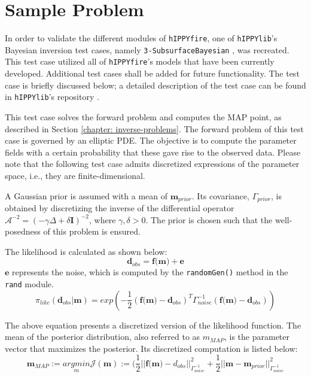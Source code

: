 \chapter{Sample Problem}
\label{chapter:sample-problem}

In order to validate the different modules of \texttt{hIPPYfire}, one of \texttt{hIPPYlib}'s Bayesian inversion test cases, namely \texttt{3-SubsurfaceBayesian} \cite{Villa_hIPPYlib_An_Extensible_2020}, was recreated. This test case utilized all of \texttt{hIPPYfire}'s models that have been currently developed. Additional test cases shall be added for future functionality. The test case is briefly discussed below; a detailed description of the test case can be found in \texttt{hIPPYlib}'s repository \cite{Villa_hIPPYlib_An_Extensible_2020}.

This test case solves the forward problem and computes the MAP point, as described in Section \ref{chapter: inverse-problems}. The forward problem of this test case is governed by an elliptic PDE. The objective is to compute the parameter fields with a certain probability that these gave rise to the observed data. Please note that the following test case admits discretized expressions of the parameter space, i.e., they are finite-dimensional.

A Gaussian prior is assumed with a mean of $\textbf{m}_{prior}$. Its covariance, \textbf{$\Gamma_{prior}$}, is obtained by discretizing the inverse of the differential operator $\mathcal{A}^{-2} = (-\gamma\Delta + \delta\textbf{I})^{-2}$, where $\gamma, \delta > 0 $. The prior is chosen such that the well-posedness of this problem is ensured.

The likelihood is calculated as shown below:
\begin{equation}
    \textbf{d}_{obs} = \textbf{f(m)} + \textbf{e}
\end{equation}
$\textbf{e}$ represents the noise, which is computed by the \texttt{randomGen()} method in the \texttt{rand} module.
\begin{equation}
    \pi_{like}(\textbf{d}_{obs} | \textbf{m}) = exp(-\frac{1}{2}(\textbf{f(m)} -\textbf{d}_{obs})^T\Gamma^{-1}_{noise}(\textbf{f(m)} -\textbf{d}_{obs}))
\end{equation}

The above equation presents a discretized version of the likelihood function. The mean of the posterior distribution, also referred to as \textbf{${m_{MAP}} $}, is the parameter vector that maximizes the posterior. Its discretized computation is listed below:
\begin{equation}
    \textbf{m}_{MAP} := \underset{m}{arg min}\mathcal{J}(\textbf{m}) := (\frac{1}{2} || \textbf{f(m)} - d_{obs} ||^2_{\Gamma_{noise}^{-1}} + \frac{1}{2}|| \textbf{m} - \textbf{m}_{prior} || ^2_{\Gamma_{noise}^{-1}}
\end{equation}

